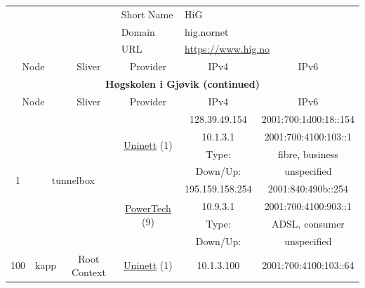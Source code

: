 \begin{small}
\begin{center}
\begin{longtable}{|c|c|c|c|c|c|c|c|}
 \multicolumn{4}{|c|}{} & \multicolumn{1}{|l|}{Short Name} & \multicolumn{3}{|l|}{\nomenclature{HiG}{Høgskolen i Gjøvik}\index{HiG|see{Høgskolen i Gjøvik}}HiG} \\* \cline{5-5}\cline{6-6}\cline{7-7}\cline{8-8}
 \multicolumn{4}{|c|}{} & \multicolumn{1}{|l|}{Domain} & \multicolumn{3}{|l|}{\index{hig.nornet}hig.nornet} \\* \cline{5-5}\cline{6-6}\cline{7-7}\cline{8-8}
 \multicolumn{4}{|c|}{} & \multicolumn{1}{|l|}{URL} & \multicolumn{3}{|l|}{\url{https://www.hig.no}} \\ \hline
 \multicolumn{2}{|p{8em}|}{Node} & \multicolumn{2}{|p{8em}|}{Sliver} & \multicolumn{2}{|p{8em}|}{Provider} & IPv4 & IPv6 \\ \hline
\endfirsthead
\hline
 \multicolumn{8}{|c|}{\textbf{Høgskolen i Gjøvik (continued)}} \\ \hline
 \multicolumn{2}{|p{8em}|}{Node} & \multicolumn{2}{|p{8em}|}{Sliver} & \multicolumn{2}{|p{8em}|}{Provider} & IPv4 & IPv6 \\ \hline
\endhead
 \multirow{8}{*}{\tiny{1}} & \multicolumn{3}{|c|}{\multirow{8}{*}{\tiny{tunnelbox}}} & \multicolumn{2}{|c|}{\multirow{4}{*}{\tiny{\href{https://www.uninett.no}{Uninett} (1)}}} & \tiny{128.39.49.154} & \tiny{2001:700:1d00:18::154} \\* \cline{7-7}\cline{8-8}
  & \multicolumn{3}{|c|}{} & \multicolumn{2}{|c|}{} & \tiny{10.1.3.1} & \tiny{2001:700:4100:103::1} \\* \cline{7-7}\cline{8-8}
  & \multicolumn{3}{|c|}{} & \multicolumn{2}{|c|}{} & Type: & fibre, business \\* \cline{7-7}\cline{8-8}
  & \multicolumn{3}{|c|}{} & \multicolumn{2}{|c|}{} & Down/Up:  & unspecified \\* \cline{5-5}\cline{6-6}\cline{7-7}\cline{8-8}
  & \multicolumn{3}{|c|}{} & \multicolumn{2}{|c|}{\multirow{4}{*}{\tiny{\href{http://www.powertech.no}{PowerTech} (9)}}} & \tiny{195.159.158.254} & \tiny{2001:840:490b::254} \\* \cline{7-7}\cline{8-8}
  & \multicolumn{3}{|c|}{} & \multicolumn{2}{|c|}{} & \tiny{10.9.3.1} & \tiny{2001:700:4100:903::1} \\* \cline{7-7}\cline{8-8}
  & \multicolumn{3}{|c|}{} & \multicolumn{2}{|c|}{} & Type: & ADSL, consumer \\* \cline{7-7}\cline{8-8}
  & \multicolumn{3}{|c|}{} & \multicolumn{2}{|c|}{} & Down/Up:  & unspecified \\ \hline
 \multirow{32}{*}{\tiny{100}} & \multicolumn{1}{|l|}{\multirow{32}{*}{\tiny{kapp}}} & \multicolumn{2}{|c|}{\multirow{2}{*}{\tiny{Root Context}}} & \multicolumn{2}{|c|}{\tiny{\href{https://www.uninett.no}{Uninett} (1)}} & \tiny{10.1.3.100} & \tiny{2001:700:4100:103::64} \\* \cline{5-5}\cline{6-6}\cline{7-7}\cline{8-8}

\end{longtable}
\end{center}
\end{small}
